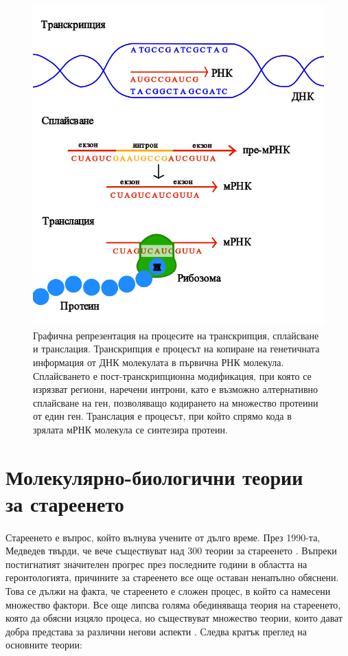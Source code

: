 \documentclass[pdftex,cyrillic,14pt,a4page,twoside,openright]{extreport}
\begin{document}
\begin{figure}[htp]
  \centering
  \includegraphics[width=12cm]{figures/transcription_splicing_translation}
  \caption {Графична репрезентация на процесите на транскрипция, сплайсване и транслация. Транскрипция е процесът на копиране на генетичната информация от ДНК молекулата в първична РНК молекула. Сплайсването е пост-транскрипционна модификация, при която се изрязват региони, наречени интрони, като е възможно алтернативно сплайсване на ген, позволяващо кодирането на множество протеини от един ген. Транслация е процесът, при който спрямо кода в зрялата мРНК молекула се синтезира протеин.}
  \label{fig:transcription_splicing_translation}
\end{figure}

\section[Молекулярно-биологични теории за стареенето]{Молекулярно-биологични теории\\ за стареенето}
\paragraph{}
Стареенето е въпрос, който вълнува учените от дълго време. През 1990-та, Медведев твърди, че вече съществуват над 300 теории за стареенето \cite{medvedev1990}. Въпреки постигнатият значителен прогрес през последните години в областта на геронтологията, причините за стареенето все още оставан ненапълно обяснени. Това се дължи на факта, че стареенето е сложен процес, в който са намесени множество фактори. Все още липсва голяма обединяваща теория на стареенето, която да обясни изцяло процеса, но съществуват множество теории, които дават добра представа за различни негови аспекти \cite{vina2007}. Следва кратък преглед на основните теории:
\end{document}
